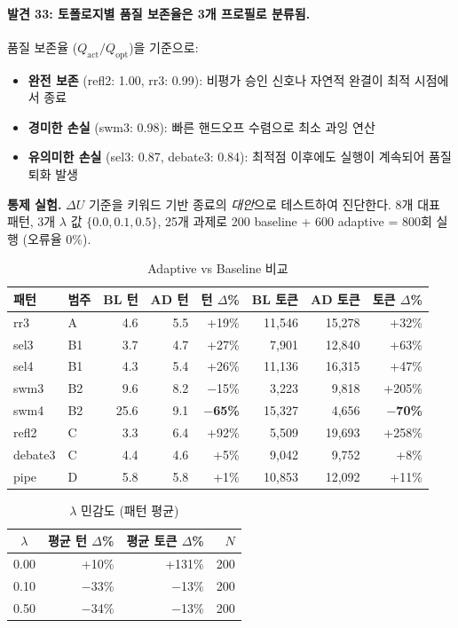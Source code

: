\paragraph{발견 33: 토폴로지별 품질 보존율은 3개 프로필로 분류됨.}
품질 보존율 ($Q_{\text{act}}/Q_{\text{opt}}$)을 기준으로:
\begin{itemize}
  \item \textbf{완전 보존} (refl2: 1.00, rr3: 0.99): 비평가 승인 신호나 자연적 완결이 최적 시점에서 종료
  \item \textbf{경미한 손실} (swm3: 0.98): 빠른 핸드오프 수렴으로 최소 과잉 연산
  \item \textbf{유의미한 손실} (sel3: 0.87, debate3: 0.84): 최적점 이후에도 실행이 계속되어 품질 퇴화 발생
\end{itemize}

\textbf{통제 실험.} $\Delta U$ 기준을 키워드 기반 종료의 \emph{대안}으로 테스트하여 진단한다. 8개 대표 패턴, 3개 $\lambda$ 값 $\{0.0, 0.1, 0.5\}$, 25개 과제로 200 baseline + 600 adaptive = 800회 실행 (오류율 0\%).

\begin{table}[H]
\centering
\caption{Adaptive vs Baseline 비교}
\label{tab:adaptive-vs-baseline}
{\small
\begin{tabular}{llrrrrrr}
\toprule
패턴 & 범주 & BL 턴 & AD 턴 & 턴 $\Delta$\% & BL 토큰 & AD 토큰 & 토큰 $\Delta$\% \\
\midrule
rr3     & A  & 4.6  & 5.5  & +19\%  & 11,546  & 15,278  & +32\% \\
sel3    & B1 & 3.7  & 4.7  & +27\%  & 7,901   & 12,840  & +63\% \\
sel4    & B1 & 4.3  & 5.4  & +26\%  & 11,136  & 16,315  & +47\% \\
swm3    & B2 & 9.6  & 8.2  & $-$15\% & 3,223  & 9,818   & +205\% \\
swm4    & B2 & 25.6 & 9.1  & \textbf{$-$65\%} & 15,327 & 4,656 & \textbf{$-$70\%} \\
refl2   & C  & 3.3  & 6.4  & +92\%  & 5,509   & 19,693  & +258\% \\
debate3 & C  & 4.4  & 4.6  & +5\%   & 9,042   & 9,752   & +8\% \\
pipe    & D  & 5.8  & 5.8  & +1\%   & 10,853  & 12,092  & +11\% \\
\bottomrule
\end{tabular}
}
\end{table}

\begin{table}[H]
\centering
\caption{$\lambda$ 민감도 (패턴 평균)}
\label{tab:lambda-pattern-avg}
{\small
\begin{tabular}{crrr}
\toprule
$\lambda$ & 평균 턴 $\Delta$\% & 평균 토큰 $\Delta$\% & $N$ \\
\midrule
0.00 & +10\%  & +131\% & 200 \\
0.10 & $-$33\% & $-$13\% & 200 \\
0.50 & $-$34\% & $-$13\% & 200 \\
\bottomrule
\end{tabular}
}
\end{table}

